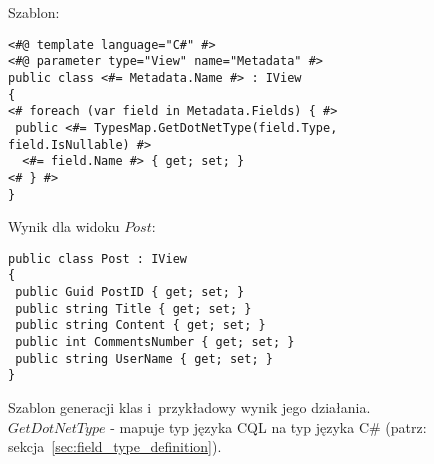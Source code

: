 \begin{figure}[!ht]
Szablon:

\begin{verbatim}
<#@ template language="C#" #>
<#@ parameter type="View" name="Metadata" #>
public class <#= Metadata.Name #> : IView
{
<# foreach (var field in Metadata.Fields) { #>
 public <#= TypesMap.GetDotNetType(field.Type, field.IsNullable) #>
  <#= field.Name #> { get; set; }
<# } #>
}
\end{verbatim}

Wynik dla widoku $Post$:

\begin{verbatim}
public class Post : IView
{
 public Guid PostID { get; set; }
 public string Title { get; set; }
 public string Content { get; set; }
 public int CommentsNumber { get; set; }
 public string UserName { get; set; }
}
\end{verbatim}

\caption{
 Szablon generacji klas i~przykładowy wynik jego działania.
 $GetDotNetType$ - mapuje typ języka CQL na typ języka C\# (patrz: sekcja~\ref{sec:field_type_definition}).}
\label{fig:single:template_class}
\end{figure}
